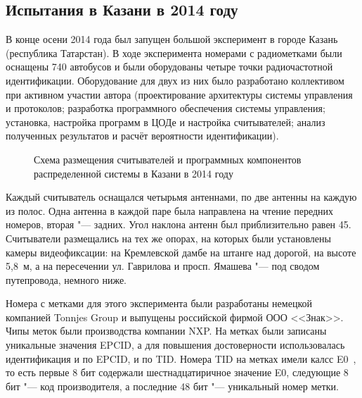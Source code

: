 \subsection{Испытания в Казани в 2014 году}\label{sec:ch5_experiments_kazan2014}

В конце осени 2014 года был запущен большой эксперимент в городе Казань (республика Татарстан). В ходе эксперимента номерами с радиометками были оснащены 740 автобусов и были оборудованы четыре точки радиочастотной идентификации. Оборудование для двух из них было разработано коллективом при активном участии автора (проектирование архитектуры системы управления и протоколов; разработка программного обеспечения системы управления; установка, настройка программ в ЦОДе и настройка считывателей; анализ полученных результатов и расчёт вероятности идентификации).

\begin{figure}[ht]
  \caption{Схема размещения считывателей и программных компонентов распределенной системы в Казани в 2014 году}
  \label{fig:ch5_kazan2014_schema}
\end{figure}

Каждый считыватель оснащался четырьмя антеннами, по две антенны на каждую из полос. Одна антенна в каждой паре была направлена на чтение передних номеров, вторая "--- задних. Угол наклона антенн был приблизительно равен 45\textdegree. Считыватели размещались на тех же опорах, на которых были установлены камеры видеофиксации: на Кремлевской дамбе на штанге над дорогой, на высоте 5,8~м, а на пересечении ул. Гаврилова и просп. Ямашева "--- под сводом путепровода, немного ниже.

Номера с метками для этого эксперимента были разработаны немецкой компанией Tonnjes Group и выпущены российской фирмой ООО <<Знак>>. Чипы меток были производства компании NXP. На метках были записаны уникальные значения EPCID, а для повышения достоверности использовалась идентификация и по EPCID, и по TID. Номера TID на метках имели калсс E0~\cite{StdGen2}, то есть первые 8 бит содержали шестнадцатиричное значение E0, следующие 8 бит "--- код производителя, а последние 48 бит "--- уникальный номер метки.

